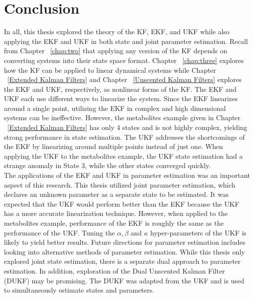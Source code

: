 \chapter{Conclusion}
\label{Conclusion}

\noindent In all, this thesis explored the theory of the KF, EKF, and UKF while also applying the EKF and UKF in both state and joint parameter estimation. Recall from Chapter ~\ref{chap:two} that applying any version of the KF depends on converting systems into their state space format. Chapter ~\ref{chap:three} explores how the KF can be applied to linear dynamical systems while Chapter ~\ref{Extended Kalman Filters} and Chapter ~\ref{Unscented Kalman Filters} explores the EKF and UKF, respectively, as nonlinear forms of the KF. The EKF and UKF each use different ways to linearize the system. Since the EKF linearizes around a single point, utilizing the EKF in complex and high dimensional systems can be ineffective. However, the metabolites example given in Chapter ~\ref{Extended Kalman Filters} has only 4 states and is not highly complex, yielding strong performance in state estimation. The UKF addresses the shortcomings of the EKF by linearizing around multiple points instead of just one. When applying the UKF to the metabolites example, the UKF state estimation had a strange anomaly in State 3, while the other states converged quickly. \\

\noindent The applications of the EKF and UKF in parameter estimation was an important aspect of this research. This thesis utilized joint parameter estimation, which declares an unknown parameter as a separate state to be estimated. It was expected that the UKF would perform better than the EKF because the UKF has a more accurate linearization technique. However, when applied to the metabolites example, performance of the EKF is roughly the same as the performance of the UKF. Tuning the $\alpha, \beta$ and $\kappa$ hyper-parameters of the UKF is likely to yield better results. Future directions for parameter estimation includes looking into alternative methods of parameter estimation. While this thesis only explored joint state estimation, there is a separate dual approach to parameter estimation. In addition, exploration of the Dual Unscented Kalman Filter (DUKF) may be promising. The DUKF was adapted from the UKF and is used to simultaneously estimate states and parameters. \\

